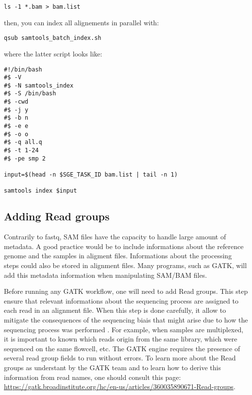 \begin{verbatim}
ls -1 *.bam > bam.list
\end{verbatim}

then, you can index all alignements in parallel with:

\begin{verbatim}
qsub samtools_batch_index.sh
\end{verbatim}

where the latter script looks like:

\begin{verbatim}
#!/bin/bash
#$ -V
#$ -N samtools_index
#$ -S /bin/bash
#$ -cwd
#$ -j y
#$ -b n
#$ -e e
#$ -o o
#$ -q all.q
#$ -t 1-24
#$ -pe smp 2

input=$(head -n $SGE_TASK_ID bam.list | tail -n 1)

samtools index $input
\end{verbatim}





\subsection{Adding Read groups}

Contrarily to fastq, SAM files have the capacity to handle large amount of metadata. A good practice would be to include informations about the reference genome and the samples in aligment files. Informations about the processing steps could also be stored in alignment files. Many programs, such as GATK, will add this metadata information when manipulating SAM/BAM files.


Before running any GATK workflow, one will need to add Read groups. This step ensure that relevant informations about the sequencing process are assigned to each read in an alignment file. When this step is done carefully, it allow to mitigate the consequences of the sequencing biais that might arise due to how the sequencing process was performed \cite{GATK_ReadGroups}. For example, when samples are multiplexed, it is important to known which reads origin from the same library, which were sequenced on the same flowcell, etc. The GATK engine requires the presence of several read group fields to run without errors. To learn more about the Read groups as understant by the GATK team and to learn how to derive this information from read names, one should consult this page: \href{https://gatk.broadinstitute.org/hc/en-us/articles/360035890671-Read-groups}{https://gatk.broadinstitute.org/hc/en-us/articles/360035890671-Read-groups}.

